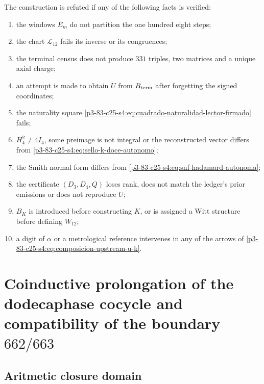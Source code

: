 \begin{remark}
The construction is refuted if any of the following facts is verified:
\begin{enumerate}
 \item the windows \(E_m\) do not partition the one hundred eight steps;
 \item the chart \(\mathcal L_{12}\) fails its inverse or its congruences;
 \item the terminal census does not produce \(331\) triples, two matrices and a unique
       axial charge;
 \item an attempt is made to obtain \(U\) from \(B_{\rm term}\) after forgetting the
       signed coordinates;
 \item the naturality square
       \eqref{p3-83-c25-s4:eq:cuadrado-naturalidad-lector-firmado} fails;
 \item \(H_4^2\neq4I_4\), some preimage is not integral or the
       reconstructed vector differs from \eqref{p3-83-c25-s4:eq:sello-k-doce-autonomo};
 \item the Smith normal form differs from
       \eqref{p3-83-c25-s4:eq:snf-hadamard-autonoma};
 \item the certificate \((D_3,D_4,Q)\) loses rank, does not match the
       ledger’s prior emissions or does not reproduce \(U\);
 \item \(B_K\) is introduced before constructing \(K\), or is assigned a
       Witt structure before defining \(W_{12}\);
 \item a digit of \(\alpha\) or a metrological reference intervenes in
       any of the arrows of \eqref{p3-83-c25-s4:eq:composicion-upstream-u-k}.
\end{enumerate}
\end{remark}



\section{Coinductive prolongation of the dodecaphase cocycle and compatibility of the boundary \texorpdfstring{\(662/663\)}{662/663}}
\label{p3-83-c25-s5:chap:acarreo-alpha-frontera-662-663}

\subsection{Aritmetic closure domain}

